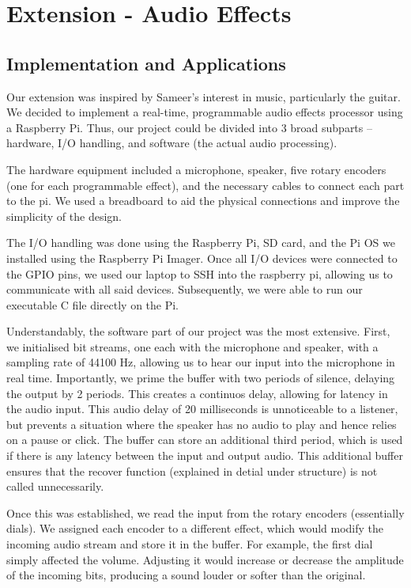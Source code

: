 \documentclass{article}
\begin{document}
\section{Extension - Audio Effects}

\subsection{Implementation and Applications}
Our extension was inspired by Sameer’s interest in music, particularly the guitar. We decided to implement a real-time, programmable audio effects processor using a Raspberry Pi. Thus, our project could be divided into 3 broad subparts – hardware, I/O handling, and software (the actual audio processing).

The hardware equipment included a microphone, speaker, five rotary encoders (one for each programmable effect), and the necessary cables to connect each part to the pi. We used a breadboard to aid the physical connections and improve the simplicity of the design.

The I/O handling was done using the Raspberry Pi, SD card, and the Pi OS we installed using the Raspberry Pi Imager. Once all I/O devices were connected to the GPIO pins, we used our laptop to SSH into the raspberry pi, allowing us to communicate with all said devices. Subsequently, we were able to run our executable C file directly on the Pi.

Understandably, the software part of our project was the most extensive. First, we initialised bit streams, one each with the microphone and speaker, with a sampling rate of 44100 Hz, allowing us to hear our input into the microphone in real time. Importantly, we prime the buffer with two periods of silence, delaying the output by 2 periods. This creates a continuos delay, allowing for latency in the audio input. This audio delay of 20 milliseconds is unnoticeable to a listener, but prevents a situation where the speaker has no audio to play and hence relies on a pause or click. The buffer can store an additional third period, which is used if there is any latency between the input and output audio. This additional buffer ensures that the recover function (explained in detial under structure) is not called unnecessarily.

Once this was established, we read the input from the rotary encoders (essentially dials). We assigned each encoder to a different effect, which would modify the incoming audio stream and store it in the buffer. For example, the first dial simply affected the volume. Adjusting it would increase or decrease the amplitude of the incoming bits, producing a sound louder or softer than the original.
\end{document}

